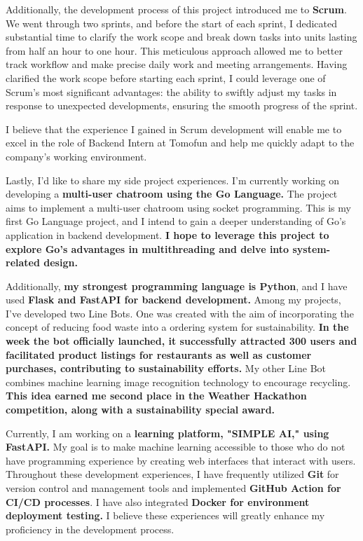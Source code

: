 Additionally, the development process of this project introduced me to \textbf{Scrum}. We went through two sprints, and before the start of each sprint, I dedicated substantial time to clarify the work scope and break down tasks into units lasting from half an hour to one hour. This meticulous approach allowed me to better track workflow and make precise daily work and meeting arrangements. Having clarified the work scope before starting each sprint, I could leverage one of Scrum's most significant advantages: the ability to swiftly adjust my tasks in response to unexpected developments, ensuring the smooth progress of the sprint.

I believe that the experience I gained in Scrum development will enable me to excel in the role of Backend Intern at Tomofun and help me quickly adapt to the company's working environment.

Lastly, I'd like to share my side project experiences. I'm currently working on developing a \textbf{multi-user chatroom using the Go Language.} The project aims to implement a multi-user chatroom using socket programming. This is my first Go Language project, and I intend to gain a deeper understanding of Go's application in backend development. \textbf{I hope to leverage this project to explore Go's advantages in multithreading and delve into system-related design.}

Additionally, \textbf{my strongest programming language is Python}, and I have used \textbf{Flask and FastAPI for backend development.} Among my projects, I've developed two Line Bots. One was created with the aim of incorporating the concept of reducing food waste into a ordering system for sustainability. \textbf{In the week the bot officially launched, it successfully attracted 300 users and facilitated product listings for restaurants as well as customer purchases, contributing to sustainability efforts.} My other Line Bot combines machine learning image recognition technology to encourage recycling. \textbf{This idea earned me second place in the Weather Hackathon competition, along with a sustainability special award.}

Currently, I am working on a \textbf{learning platform, "SIMPLE AI," using FastAPI.} My goal is to make machine learning accessible to those who do not have programming experience by creating web interfaces that interact with users. Throughout these development experiences, I have frequently utilized \textbf{Git} for version control and management tools and implemented \textbf{GitHub Action for CI/CD processes}. I have also integrated \textbf{Docker for environment deployment testing.} I believe these experiences will greatly enhance my proficiency in the development process.

